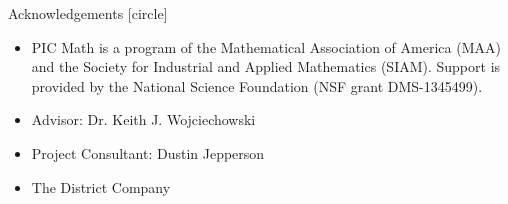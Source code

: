 \documentclass[compress,blue]{beamer}
\begin{document}
\begin{frame}{Acknowledgements}
[circle]
\begin{itemize}
\item PIC Math is a program of the Mathematical Association of America (MAA) and the Society for Industrial and Applied Mathematics (SIAM).  Support is provided by the National Science Foundation (NSF grant DMS-1345499).

\item Advisor: Dr. Keith J. Wojciechowski

\item Project Consultant: Dustin Jepperson

\item The District Company
\end{itemize}

\end{frame}
\end{document}
